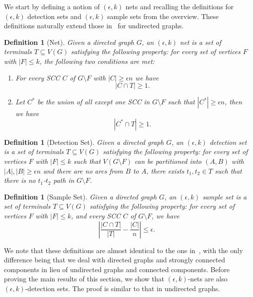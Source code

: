 \documentclass[11pt]{article}
\newtheorem{definition}[theorem]{Definition}
\begin{document}
We start by defining a notion of $(\epsilon,k)$ nets and recalling the definitions for $(\epsilon, k)$ detection sets and  $(\epsilon,k)$ sample sets from the overview. These definitions naturally extend those in~\cite{fm06} for undirected graphs.


\begin{definition}[Net]
Given a directed graph $G$, an $(\epsilon, k)$ net is a set of terminals $T \subseteq V(G)$ satisfying the following property: for every set of vertices $F$ with $|F| \leq k$, the following two conditions are met:
\begin{enumerate}
\item For every SCC $C$ of $G \setminus F$ with $|C| \geq \epsilon n$ we have 
$$|C \cap T| \geq 1.$$
\item Let $C^*$ be the union of all except one SCC in $G \setminus F$ such that $|C^*| \geq \epsilon n$, then we have
$$|C^* \cap T| \geq 1.$$
\end{enumerate}
\end{definition}

\begin{definition}[Detection Set]\label{def:detection_set}
Given a directed graph $G$, an $(\epsilon, k)$ detection set is a set of terminals $T \subseteq V(G)$ satisfying the following property: for every set of vertices $F$ with $|F| \leq k$ such that $V(G \setminus F)$ can be partitioned into $(A,B)$ with $|A|, |B| \geq \epsilon n$ and there are no arcs from $B$ to $A$, there exists $t_1, t_2 \in T$ such that there is no $t_1$-$t_2$ path in $G \setminus F$.
\end{definition}

\begin{definition}[Sample Set]\label{def:sample_set}
Given a directed graph $G$, an $(\epsilon, k)$ sample set is a set of terminals $T \subseteq V(G)$ satisfying the following property: for every set of vertices $F$ with $|F| \leq k$, and every SCC $C$ of $G \setminus F$, we have 
$$\left |\frac{|C \cap T|}{|T|} - \frac{|C|}{n}\right | \leq \epsilon.$$

\end{definition}
We note that these definitions are almost identical to the one in~\cite{fm06}, with the only difference being that we deal with directed graphs and strongly connected components in lieu of undirected graphs and connected components. Before proving the main results of this section, we show that $(\epsilon,k)$-nets are also $(\epsilon,k)$-detection sets. The proof is similar to that in undirected graphs.
\end{document}
